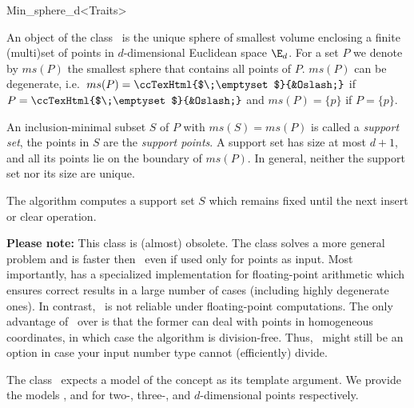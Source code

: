 
    \begin{ccRefClass}{Min_sphere_d<Traits>}
\cgalSetMinSphereLayout

\ccDefinition

An object of the class \ccRefName\ is the unique sphere of
smallest volume enclosing a finite (multi)set of points in $d$-dimensional
Euclidean space $\E_d$. For a set $P$ we denote by $ms(P)$ the
smallest sphere that contains all points of $P$. $ms(P)$ can
be degenerate, i.e.\ $ms(P)=\mbox{\ccTexHtml{$\;\emptyset$}{&Oslash;}}$
if $P=\mbox{\ccTexHtml{$\;\emptyset$}{&Oslash;}}$ and $ms(P)=\{p\}$ if
$P=\{p\}$.

An inclusion-minimal subset $S$ of $P$ with $ms(S)=ms(P)$ is called a
\emph{support set}, the points in $S$ are the \emph{support points}.
A support set has size at most $d+1$, and all its points lie on the
boundary of $ms(P)$. In general, neither the support set nor its size
are unique.

The algorithm
computes a support set $S$ which remains fixed until the next insert
or clear operation.

\textbf{Please note:} This class is (almost) obsolete. The class
 solves a more general problem
and is faster then \ccRefName\, even if used only for points
as input. Most importantly,  has
a specialized implementation for floating-point arithmetic which
ensures correct results in a large number of cases (including
highly degenerate ones). In contrast, \ccRefName\ is not reliable
under floating-point computations. The only advantage of 
\ccRefName\ over  is that the
former can deal with points in homogeneous coordinates, in which 
case the algorithm is division-free. Thus, \ccRefName\ might still
be an option in case your input number type cannot (efficiently) 
divide.


    \ccRequirements
    \ccIndexRequirements

    The class \ccRefName\ expects a model of the concept
     as its template argument.
      We provide the models ,
       and 
    for two-, three-, and $d$-dimensional points respectively.


\end{ccRefClass}

